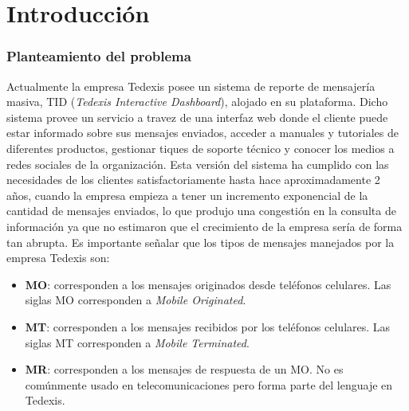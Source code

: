 \chapter*{Introducción} \label{sec:Introduccion}

\vspace{5 mm}

\subsection*{Planteamiento del problema}
Actualmente la empresa Tedexis posee un sistema de reporte de mensajería masiva, TID (\textit{Tedexis Interactive Dashboard}), alojado en su plataforma. Dicho sistema provee un servicio a travez de una interfaz web donde el cliente puede estar informado sobre sus mensajes enviados, acceder a manuales y tutoriales de diferentes productos, gestionar tiques de soporte técnico y conocer los medios a redes sociales de la organización.
\newline
\newline
\indent Esta versión del sistema ha cumplido con las necesidades de los clientes satisfactoriamente hasta hace aproximadamente 2 años, cuando la empresa empieza a tener un incremento exponencial de la cantidad de mensajes enviados, lo que produjo una congestión en la consulta de información ya que no estimaron que el crecimiento de la empresa sería de forma tan abrupta.
\newline
\newline
\indent Es importante señalar que los tipos de mensajes manejados por la empresa Tedexis son:
\begin{itemize}[noitemsep,nolistsep]
\item \textbf{MO}: corresponden a los mensajes originados desde teléfonos celulares. Las siglas MO corresponden a \textit{Mobile Originated}.
\item \textbf{MT}: corresponden a los mensajes recibidos por los teléfonos celulares. Las siglas MT corresponden a \textit{Mobile Terminated}.
\item \textbf{MR}: corresponden a los mensajes de respuesta de un MO. No es comúnmente usado en telecomunicaciones pero forma parte del lenguaje en Tedexis.
\newline
\end{itemize}

